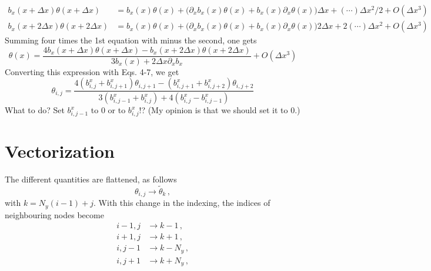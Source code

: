 \documentclass[notitlepage]{revtex4-2}
\begin{document}
\begin{align}
b_x(x+\Delta x)\theta(x+\Delta x) &= b_x(x)\theta(x) + \Big(\partial_x b_x(x) \theta(x)+ b_x(x)\partial_x \theta(x)\Big)\Delta x + (\cdots)\Delta x^2/2 + O(\Delta x^3)\\
b_x(x+2\Delta x)\theta(x+2\Delta x) &= b_x(x)\theta(x) + \Big(\partial_x b_x(x)\theta(x)+ b_x(x)\partial_x \theta(x)\Big)2\Delta x + 2(\cdots)\Delta x^2 + O(\Delta x^3)
\end{align}
Summing four times the 1st equation with minus the second, one gets
\begin{equation}
\theta(x) = \frac{4b_x(x+\Delta x)\theta(x+\Delta x)-b_x(x+2\Delta x)\theta(x+2\Delta x)}{3b_x(x)+2\Delta x\partial_xb_x}+O(\Delta x^3)
\end{equation}
Converting this expression with Eqs. 4-7, we get
\begin{equation}
\theta_{i,j} = \frac{4(b^x_{i,j}+b^x_{i,j+1})\theta_{i,j+1} - (b^x_{i,j+1}+b^x_{i,j+2})\theta_{i,j+2}}{3(b^x_{i,j-1}+b^x_{i,j})+4(b^x_{i,j}-b^x_{i,j-1})}
\end{equation}
What to do? Set $b^x_{i,j-1}$ to $0$ or to $b^x_{i,j}$!? (My opinion is that we should set it to 0.)


\section{Vectorization}
The different quantities are flattened, as follows
\begin{equation}
\theta_{i,j} \rightarrow \tilde\theta_k\,,
\end{equation}
with $k = N_y(i-1)+j$. With this change in the indexing, the indices of neighbouring nodes become
\begin{align}
i-1,j &\rightarrow k-1\,,\\
i+1,j &\rightarrow k+1\,,\\
i,j-1 &\rightarrow k-N_y\,,\\
i,j+1 &\rightarrow k+N_y\,,
\end{align}
\end{document}

